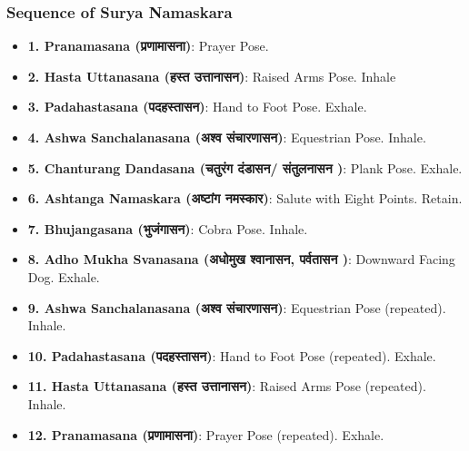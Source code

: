 \begin{frame}[fragile]\frametitle{Sequence of Surya Namaskara}

      \begin{itemize}
        \item \textbf{1. Pranamasana (प्रणामासना)}: Prayer Pose.
        \item \textbf{2. Hasta Uttanasana (हस्त उत्तानासन)}: Raised Arms Pose. Inhale
        \item \textbf{3. Padahastasana (पदहस्तासन)}: Hand to Foot Pose. Exhale.
        \item \textbf{4. Ashwa Sanchalanasana (अश्व संचारणासन)}: Equestrian Pose. Inhale.
        \item \textbf{5. Chanturang Dandasana (चतुरंग दंडासन/ संतुलनासन )}: Plank Pose. Exhale.
        \item \textbf{6. Ashtanga Namaskara (अष्टांग नमस्कार)}: Salute with Eight Points. Retain.
        \item \textbf{7. Bhujangasana (भुजंगासन)}: Cobra Pose. Inhale.
        \item \textbf{8. Adho Mukha Svanasana (अधोमुख श्वानासन, पर्वतासन )}: Downward Facing Dog. Exhale.
        \item \textbf{9. Ashwa Sanchalanasana (अश्व संचारणासन)}: Equestrian Pose (repeated). Inhale.
        \item \textbf{10. Padahastasana (पदहस्तासन)}: Hand to Foot Pose (repeated). Exhale.
        \item \textbf{11. Hasta Uttanasana (हस्त उत्तानासन)}: Raised Arms Pose (repeated). Inhale.
        \item \textbf{12. Pranamasana (प्रणामासना)}: Prayer Pose (repeated). Exhale.
      \end{itemize}
 
\end{frame}


